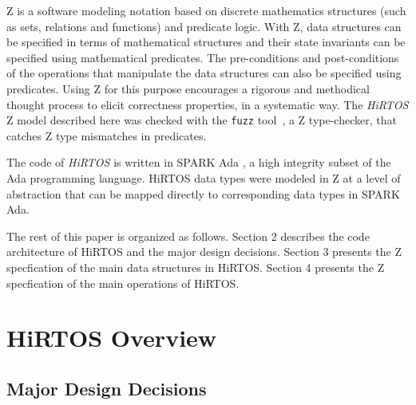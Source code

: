 \documentclass{AUJarticle}
\begin{document}
Z is a software modeling notation based on discrete mathematics structures (such as sets,
relations and functions) and predicate logic. With Z, data structures can be specified in
terms of mathematical structures and their state invariants can be specified using mathematical
predicates. The pre-conditions and post-conditions of the operations that manipulate
the data structures can also be specified using predicates. Using Z for this purpose encourages
a rigorous and methodical thought process to elicit correctness properties, in a systematic way.
The \emph{HiRTOS} Z model described here was checked with the \verb'fuzz' tool~\cite{Fuzz}, a
Z type-checker, that catches Z type mismatches in predicates.

The code of \emph{HiRTOS} is written in SPARK Ada \cite{SparkAda}, a high integrity
subset of the Ada programming language. HiRTOS data types were modeled in Z at a level of
abstraction that can be mapped directly to corresponding data types in SPARK Ada.

The rest of this paper is organized as follows. Section 2 describes the code architecture of
HiRTOS and the major design decisions. Section 3 presents the Z specfication of the main data
structures in HiRTOS. Section 4 presents the Z specfication of the main operations of HiRTOS.

\section{HiRTOS Overview}

\subsection{Major Design Decisions}
\end{document}
